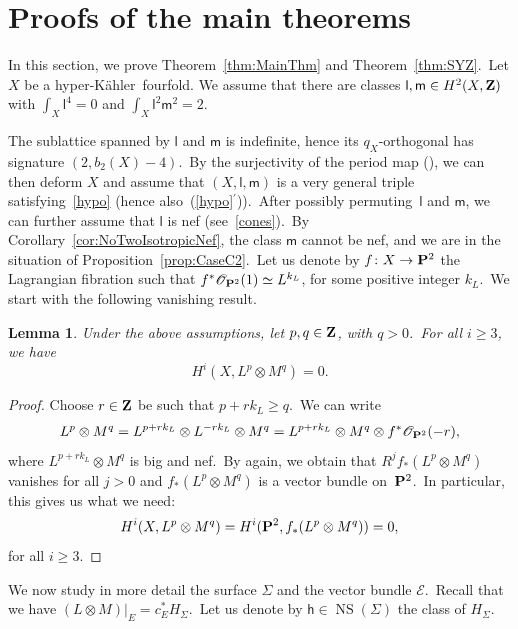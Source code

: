 \documentclass[12pt]{amsart}
\def\cO{\mathscr{O}}
\def\cE{\mathscr{E}}
\def\Z{{\bf Z}}
\def\P{{\bf P}}
\DeclareMathOperator{\NS}{NS}
\def\otp{}
\def\ot{\otimes}
\def\isom{\simeq}
\def\hk{hyper-K\"ahler}
\newtheorem{lemm}{Lemma}[section]
\theoremstyle{remark}
\def\hh{\ensuremath{\mathsf h}}
\def\lll{\ensuremath{\mathsf l}}
\def\mm{\ensuremath{\mathsf m}}
\begin{document}

\section{Proofs of the main theorems}\label{sec:OGrady}

In this section, we prove Theorem~\ref{thm:MainThm} and Theorem~\ref{thm:SYZ}.\
Let $X$ be a  \hk\ fourfold.
We assume that there are classes $\lll,\mm\in H^2(X,\Z)$ with $\int_X \lll^4=0$ and $\int_X\lll^2\mm^2=2$.

The sublattice spanned by $\lll$ and $\mm$ is indefinite, hence its $q_X$-orthogonal has signature $(2,b_2(X)-4)$.\ 
By the surjectivity of the period map (\cite{HuyHK}), we can then deform $X$ and assume that  $(X,\lll,\mm)$ is a very general triple satisfying~\eqref{hypo} (hence also~(\ref{hypo}$^\prime$)).\
After possibly permuting~$\lll$ and $\mm$, we can further assume that $\lll$ is
nef (see~\eqref{cones}).\
By Corollary~\ref{cor:NoTwoIsotropicNef}, the class $\mm$ cannot be nef, and we are in the situation of Proposition~\ref{prop:CaseC2}.\
Let us denote by $f\colon X \to \P^2$ the Lagrangian fibration such that $f^*\cO_{\P^2}(1)\isom L^{\otp k_L}$, for some positive integer $k_L$.\
We start with the following vanishing result.

\begin{lemm}\label{lem:vanishing}
Under the above assumptions, let $p,q\in\Z$, with $q>0$.\
For all $i\geq 3$, we have
\[
H^i(X,L^{\otp p}\otimes M^{\otp q})=0.
\]
\end{lemm}

\begin{proof}
Choose $r\in\Z$ be such that $p+rk_L \geq q$.\
We can write
\[
L^{\otp p}\otimes M^{\otp q} =  L^{\otp p+rk_L}  \otimes L^{-rk_L} \ot M^{\otp q}=  L^{\otp p+rk_L} \otimes M^{\otp q}\otimes f^*\cO_{\P^2}(-r),
\]
where $ L^{\otp p+rk_L}\ot M^{\otp q}$ is big and nef.\
By \cite[Theorem~10.32]{kol} again, we obtain that $R^j f_* (L^{\otp p}\otimes M^{\otp q})$ vanishes for all $j>0$ and $f_* (L^{\otp p}\otimes M^{\otp q})$ is a vector bundle on~$\P^2$.\ 
In particular, this gives us what we need:
\[
H^i(X, L^{\otp p}\otimes M^{\otp q}) = H^i(\P^2, f_* (L^{\otp p}\otimes M^{\otp q})) = 0,
\]
for all $i\geq3$.
\end{proof}

We now study in more detail the surface $\Sigma$ and the vector bundle $\cE$.\
Recall that we have $(L\otimes M)\vert_E = c_E^* H_{\Sigma}$.\
Let us denote by $\hh\in \NS(\Sigma)$ the  class of $H_{\Sigma}$.
\end{document}
